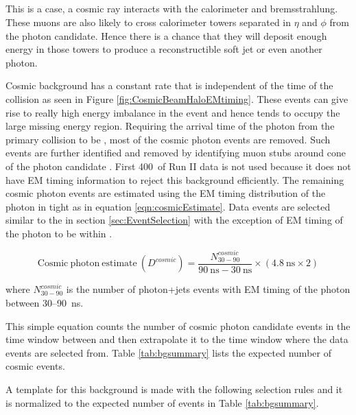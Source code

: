 \documentclass[11pt]{article}
\begin{document}
\subsection{\cosmicjets}\label{sec:cosmicjets}
This is a case, a cosmic ray interacts with the calorimeter and bremsstrahlung. These muons are also likely to cross calorimeter towers separated in $\eta$ and $\phi$ from the photon candidate. Hence there is a chance that they will deposit enough energy in those towers to produce a reconstructible soft jet or even another photon.

Cosmic background has a constant rate that is independent of the time of the collision as seen in Figure \ref{fig:CosmicBeamHaloEMtiming}. These events can give rise to really high energy imbalance in the event and hence tends to occupy the large missing energy region. Requiring the arrival time of the photon from the primary collision to be \intimewindow, most of the cosmic photon events are removed. Such events are further identified and removed by identifying muon stubs around cone of the photon candidate  \cite{cdfnote:8409, cdfnote:7960}. First 400~\pbi of Run II data is not used because it does not have EM timing information to reject this background efficiently. The remaining cosmic photon events are estimated using the EM timing distribution of the photon in tight \phojets as in equation \ref{eqn:cosmicEstimate}. Data events are selected similar to the  in section \ref{sec:EventSelection} with the exception of EM timing of the photon to be within \cosmictimewindow.

\begin{equation}
\mathrm{Cosmic~photon~estimate}~(D^{cosmic}) = \frac{N_{30-90}^{cosmic}}{90~\mathrm{ns} - 30~\mathrm{ns}} \times (4.8~\mathrm{ns}\times2)
\label{eqn:cosmicEstimate}
\end{equation}

where $N_{30-90}^{cosmic}$ is the number of photon+jets events with EM timing of the photon between 30--90~ns.

This simple equation counts the number of cosmic photon candidate events in the time window between \cosmictimewindow and then extrapolate it to the \intimewindow time window where the data events are selected from. Table \ref{tab:bgsummary} lists the expected number of cosmic events.

A template for this background is made with the following selection rules and it is normalized to the expected number of events in Table \ref{tab:bgsummary}.
\end{document}
